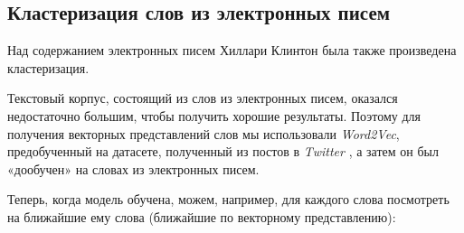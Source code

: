 \subsection{Кластеризация слов из электронных писем}

Над содержанием электронных писем Хиллари Клинтон была также произведена кластеризация. 

Текстовый корпус, состоящий из слов из электронных писем, оказался недостаточно большим, чтобы получить хорошие результаты. Поэтому для получения векторных представлений
слов мы использовали \textit{Word2Vec}, предобученный на датасете, полученный из постов в \textit{Twitter} \cite{bib6}, а затем он был «дообучен» на словах из электронных писем.


Теперь, когда модель обучена, можем, например, для каждого слова посмотреть на 
ближайшие ему слова (ближайшие по векторному представлению):

